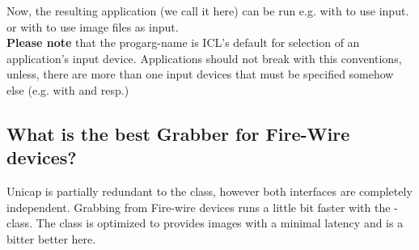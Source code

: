 \begin{enumerate}
Now, the resulting application (we call it  here) can be run e.g. with  to use  input. or with  to use image files as input.\\ \textbf{Please note} that the progarg-name  is ICL's default for selection of an application's input device. Applications should not break with this conventions, unless, there are more than one input devices that must be specified somehow else (e.g. with  and  resp.)


\end{enumerate}


\subsection{What is the best Grabber for Fire-Wire devices?}
Unicap is partially redundant to the  class, however both interfaces are completely independent. Grabbing from Fire-wire devices runs a little bit faster with the -class. The  class is optimized to provides images with a minimal latency and is a bitter better here. 

